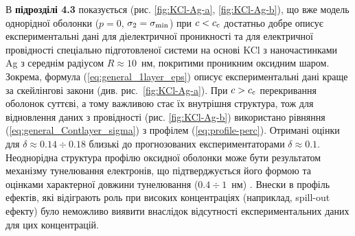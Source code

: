 \documentclass[twoside,a4paper,14pt]{vakaref-utf8}
\begin{document}
В {\bf підрозділі 4.3} показується (рис. \ref{fig:KCl-Ag-a}, \ref{fig:KCl-Ag-b}), що вже модель однорідної оболонки ($p=0$, $\sigma_2 = \sigma_{\rm min}$) при $c < c_{\rm c}$ достатньо добре описує експериментальні дані \cite{Grannan1981} для діелектричної проникності та \cite{ChenI.-G.1986} для електричної провідності спеціально підготовленої системи на основі KCl з наночастинками Ag з середнім радіусом $R\approx 10$~нм, покритими проникним оксидним шаром. 
Зокрема, формула (\ref{eq:general_1layer_eps}) описує експериментальні дані краще за скейлінгові закони (див. рис.~\ref{fig:KCl-Ag-a}). 
При  $c > c_{\rm c}$ перекривання оболонок суттєві, а тому важливою стає їх внутрішня структура, тож для відновлення даних з провідності (рис. \ref{fig:KCl-Ag-b}) використано рівняння (\ref{eq:general_Contlayer_sigma}) з профілем (\ref{eq:profile-perc}).
Отримані оцінки для $\delta \approx 0.14 \div 0.18$ близькі до прогнозованих експериментаторами $\delta \approx 0.1$.
Неоднорідна структура профілю оксидної оболонки може бути результатом механізму тунелювання електронів, що підтверджується його формою та оцінками характерної довжини тунелювання ($0.4\div 1$~нм) \cite{Ambrosetti2009}. 
Внески в профіль ефектів, які відіграють роль при високих концентраціях (наприклад, spill-out ефекту) було неможливо виявити внаслідок відсутності експериментальних даних для цих концентрацій.
\end{document}
